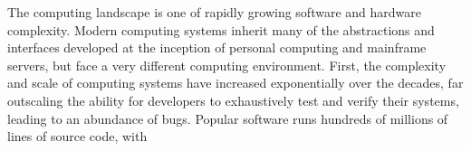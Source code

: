 
The computing landscape is one of rapidly growing software and hardware
complexity.
Modern computing systems inherit many of the abstractions and interfaces
developed at the inception of personal computing and mainframe servers,
but face a very different computing environment.
First, the complexity and scale of computing systems have increased 
exponentially over the decades, far outscaling the ability for developers to 
exhaustively test and verify their systems, leading to an abundance of bugs.
Popular software runs hundreds of millions of lines of source code, with
